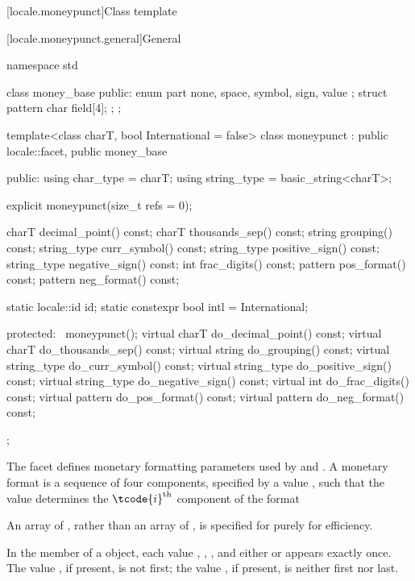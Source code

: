[locale.moneypunct]{Class template }

[locale.moneypunct.general]{General}

%
\begin{codeblock}
namespace std {
  class money_base {
  public:
    enum part { none, space, symbol, sign, value };
    struct pattern { char field[4]; };
  };

  template<class charT, bool International = false>
    class moneypunct : public locale::facet, public money_base {
    public:
      using char_type   = charT;
      using string_type = basic_string<charT>;

      explicit moneypunct(size_t refs = 0);

      charT        decimal_point() const;
      charT        thousands_sep() const;
      string       grouping()      const;
      string_type  curr_symbol()   const;
      string_type  positive_sign() const;
      string_type  negative_sign() const;
      int          frac_digits()   const;
      pattern      pos_format()    const;
      pattern      neg_format()    const;

      static locale::id id;
      static constexpr bool intl = International;

    protected:
      ~moneypunct();
      virtual charT        do_decimal_point() const;
      virtual charT        do_thousands_sep() const;
      virtual string       do_grouping()      const;
      virtual string_type  do_curr_symbol()   const;
      virtual string_type  do_positive_sign() const;
      virtual string_type  do_negative_sign() const;
      virtual int          do_frac_digits()   const;
      virtual pattern      do_pos_format()    const;
      virtual pattern      do_neg_format()    const;
    };
}
\end{codeblock}

\pnum
The  facet defines monetary formatting parameters
used by  and .
A monetary format is a sequence of four components,
specified by a  value ,
such that the  value 
determines the $\tcode{i}^\text{th}$ component of the format
\begin{footnote}
An array of ,
rather than an array of ,
is specified for  purely for efficiency.
\end{footnote}
In the  member of a  object,
each value , , , and
either  or 
appears exactly once.
The value , if present, is not first;
the value , if present, is neither first nor last.

